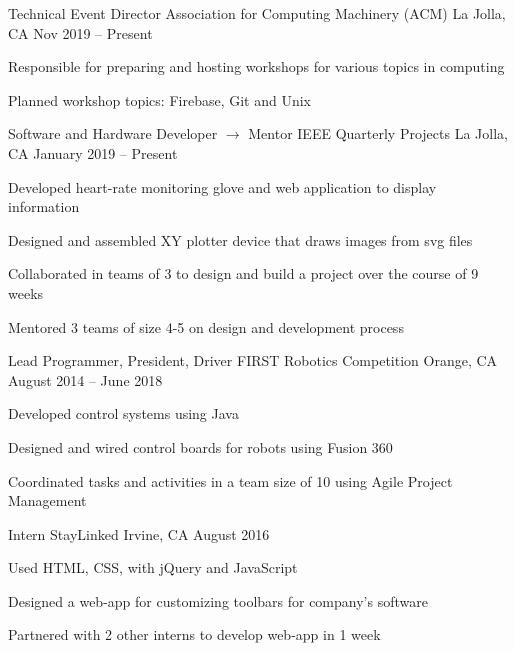 \documentclass[]{awesome-cv}
\begin{document}
\vspace{-5mm}
\begin{cventries}
	\cventry
  {Technical Event Director}
  {Association for Computing Machinery (ACM)}
	{La Jolla, CA}
  {Nov 2019 – Present}
	{\begin{cvitems}
    \item {Responsible for preparing and hosting workshops for various topics in
      computing}
    \item {Planned workshop topics: Firebase, Git and Unix}
		\end{cvitems}}

	\vspace{-5mm}
	\cventry
  {Software and Hardware Developer $\longrightarrow$  Mentor}
	{IEEE Quarterly Projects}
	{La Jolla, CA}
  {January 2019 – Present}
	{\begin{cvitems}
		\item {Developed heart-rate monitoring glove and web application to display
      information}
    \item {Designed and assembled XY plotter device that draws images from svg
      files}
    \item {Collaborated in teams of 3 to design and build a project over the
      course of 9 weeks}
    \item {Mentored 3 teams of size 4-5 on design and development process}
		\end{cvitems}}

	\vspace{-5mm}
	\cventry
	{Lead Programmer, President, Driver}
	{FIRST Robotics Competition}
	{Orange, CA}
	{August 2014 – June 2018}
	{\begin{cvitems}
		\item {Developed control systems using Java}
		\item {Designed and wired control boards for robots using Fusion 360}
		\item {Coordinated tasks and activities in a team size of 10 using Agile
      Project Management}
		\end{cvitems}}

	\vspace{-5mm}
	\cventry
	{Intern}
	{StayLinked}
	{Irvine, CA}
	{August 2016}
	{\begin{cvitems}
		\item {Used HTML, CSS, with jQuery and JavaScript}
		\item {Designed a web-app for customizing toolbars for company’s software}
    \item {Partnered with 2 other interns to develop web-app in 1 week}
		\end{cvitems}}

\end{cventries}
\end{document}
